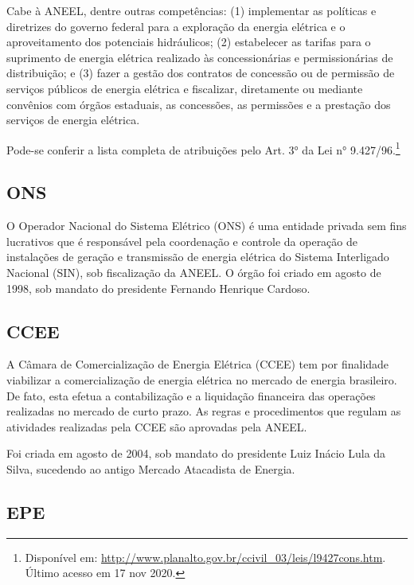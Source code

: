 \documentclass[grad,numbers]{coppe}
\begin{document}
  Cabe à ANEEL, dentre outras competências: (1) implementar as políticas e diretrizes do governo federal para a exploração da energia elétrica e o aproveitamento dos potenciais hidráulicos; (2) estabelecer as tarifas para o suprimento de energia elétrica realizado às concessionárias e permissionárias de distribuição; e (3) fazer a gestão dos contratos de concessão ou de permissão de serviços públicos de energia elétrica e fiscalizar, diretamente ou mediante convênios com órgãos estaduais, as concessões, as permissões e a prestação dos serviços de energia elétrica.

  Pode-se conferir a lista completa de atribuições pelo Art. 3° da Lei n° 9.427/96.\footnote{Disponível em: \url{http://www.planalto.gov.br/ccivil_03/leis/l9427cons.htm}. Último acesso em 17 nov 2020.}

  \hypertarget{ons}{%
  \subsection{ONS}\label{ons}}

  O Operador Nacional do Sistema Elétrico (ONS) é uma entidade privada sem fins lucrativos que é responsável pela coordenação e controle da operação de instalações de geração e transmissão de energia elétrica do Sistema Interligado Nacional (SIN), sob fiscalização da ANEEL. O órgão foi criado em agosto de 1998, sob mandato do presidente Fernando Henrique Cardoso.

  \hypertarget{ccee}{%
  \subsection{CCEE}\label{ccee}}

  A Câmara de Comercialização de Energia Elétrica (CCEE) tem por finalidade viabilizar a comercialização de energia elétrica no mercado de energia brasileiro. De fato, esta efetua a contabilização e a liquidação financeira das operações realizadas no mercado de curto prazo. As regras e procedimentos que regulam as atividades realizadas pela CCEE são aprovadas pela ANEEL.

  Foi criada em agosto de 2004, sob mandato do presidente Luiz Inácio Lula da Silva, sucedendo ao antigo Mercado Atacadista de Energia.

  \hypertarget{epe}{%
  \subsection{EPE}\label{epe}}
\end{document}
